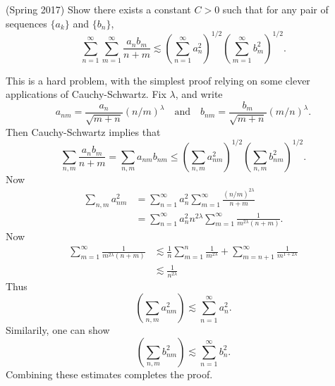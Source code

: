 \documentclass{exam}
\theoremstyle{problemstyle}
\newcommand{\1}[1]{\textbf{1}_{\left[#1\right]}} %
\begin{document}
\begin{questions}
\question (Spring 2017) Show there exists a constant $C > 0$ such that for any pair of sequences $\{ a_k \}$ and $\{ b_n \}$,
%
\[ \sum_{n = 1}^\infty \sum_{m = 1}^\infty \frac{a_n b_m}{n + m} \lesssim \left( \sum_{n = 1}^\infty a_n^2 \right)^{1/2} \left( \sum_{m = 1}^\infty b_m^2 \right)^{1/2}. \]
\begin{solution}
	This is a hard problem, with the simplest proof relying on some clever applications of Cauchy-Schwartz. Fix $\lambda$, and write
	\[ a_{nm} = \frac{a_n}{\sqrt{m + n}} (n/m)^\lambda \quad\text{and}\quad b_{nm} = \frac{b_m}{\sqrt{m + n}} (m/n)^\lambda. \]
	Then Cauchy-Schwartz implies that
	\[ \sum_{n,m} \frac{a_n b_m}{n + m} = \sum_{n,m} a_{nm} b_{nm} \leq \left( \sum_{n,m} a_{nm}^2 \right)^{1/2} \left( \sum_{n,m} b_{nm}^2 \right)^{1/2}. \]
	Now
	\begin{align*}
		\sum_{n,m} a_{nm}^2 &= \sum_{n = 1}^\infty a_n^2 \sum_{m = 1}^\infty \frac{(n/m)^{2\lambda}}{n + m}\\
		&= \sum_{n = 1}^\infty a_n^2 n^{2\lambda} \sum_{m = 1}^\infty \frac{1}{m^{2\lambda} (n + m)}. 
	\end{align*}
	Now
	\begin{align*}
		\sum_{m = 1}^\infty \frac{1}{m^{2\lambda} (n + m)} &\lesssim \frac{1}{n} \sum_{m = 1}^n \frac{1}{m^{2\lambda}} + \sum_{m = n+1}^\infty \frac{1}{m^{1 + 2\lambda}}\\
		&\lesssim \frac{1}{n^{2\lambda}}
	\end{align*}
	Thus
	\[ \left( \sum_{n,m} a_{nm}^2 \right) \lesssim \sum_{n = 1}^\infty a_n^2. \]
	Similarily, one can show
	\[ \left( \sum_{n,m} b_{nm}^2 \right) \lesssim \sum_{n = 1}^\infty b_n^2. \]
	Combining these estimates completes the proof.


\end{solution}
\end{questions}
\end{document}
